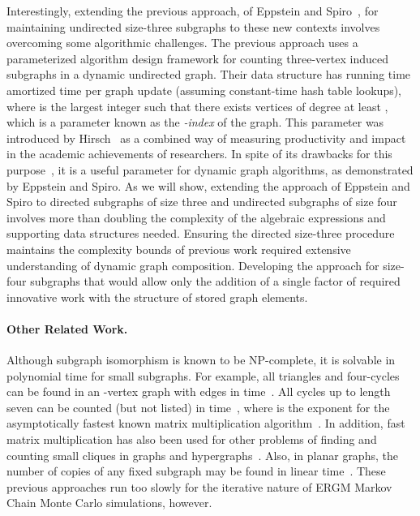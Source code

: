 \documentclass[11pt]{article}
\renewcommand{\subsection}[1]{\paragraph{\textbf{#1}.}}
\begin{document}
Interestingly, extending the previous approach, of 
Eppstein and Spiro~\cite{es-hgadss-09},
for maintaining undirected size-three subgraphs to these new contexts involves
overcoming some algorithmic challenges.
The previous approach uses a parameterized algorithm
design framework for counting three-vertex induced 
subgraphs in a dynamic undirected graph. Their data structure
has running time  amortized time per graph
update (assuming constant-time hash table lookups), 
where  is the largest integer such that there exists
 vertices of degree at least , which is a parameter 
known as the \emph{-index} of the graph.
This parameter was introduced by Hirsch~\cite{Hir-PNAS-05} as a combined
way of measuring productivity and
impact in the academic achievements of researchers. 
\ifFull
In spite of its
drawbacks for this purpose~\cite{AdlEwiTay-JCQAR-08}, it is a useful
parameter for dynamic graph algorithms, as demonstrated 
by Eppstein and Spiro.
\fi
As we will show,
extending the approach of Eppstein and Spiro to directed
subgraphs of size three and undirected subgraphs of size four involves
more than doubling the 
complexity of the algebraic expressions and supporting data structures needed.
Ensuring the directed size-three procedure maintains the complexity bounds of 
previous work required extensive understanding of dynamic graph composition.  Developing 
the approach for size-four subgraphs that would allow only the addition of a single 
factor of  required innovative work with the structure of stored graph elements.


\subsection{Other Related Work}
Although subgraph isomorphism is known to be NP-complete,
it is solvable in polynomial time for small subgraphs.
For example, all triangles and four-cycles can be found 
in an -vertex graph with  edges 
in  time~\cite{ItaRod-SJC-78,ChiNis-SICOMP-85}. 
All cycles up to length seven can be counted (but not listed) in 
 time~\cite{AloYusZwi-Algo-97},
where  is the exponent for the asymptotically 
fastest known matrix multiplication algorithm~\cite{CopWin-JSC-90}.
\ifFull
In addition,
fast matrix multiplication has also been used for other problems of finding
and counting small cliques in graphs and
hypergraphs~\cite{EisGra-TCS-04,KloKraMue-IPL-00,NesPol-CMUC-85,VasWil-STOC-09,Yus-IPL-06}.
\fi
Also, in planar graphs, 
the number of copies of any fixed subgraph may be found in linear
time~\cite{Epp-JGAA-99,Epp-Algo-00}.
These previous approaches run too slowly for the iterative nature of
ERGM Markov Chain Monte Carlo simulations, however.
\end{document}

